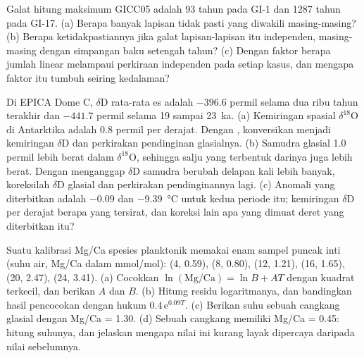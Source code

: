 \begin{exercise}[$\star\star$]\label{exo:b2:climate-proxies:9}
Galat hitung maksimum GICC05 adalah 93 tahun pada GI-1 dan \num{1287} tahun pada GI-17. (a) Berapa banyak
lapisan tidak pasti yang diwakili masing-masing? (b) Berapa ketidakpastiannya jika galat lapisan-lapisan
itu independen, masing-masing dengan simpangan baku setengah tahun? (c) Dengan faktor berapa
jumlah linear melampaui perkiraan independen pada setiap kasus, dan mengapa faktor itu tumbuh seiring kedalaman?
\end{exercise}

\begin{exercise}[$\star\star\star$]\label{exo:b2:climate-proxies:10}
Di EPICA Dome C, $\delta$D rata-rata es adalah $-396.6$ permil selama dua ribu tahun terakhir
dan $-441.7$ permil selama 19 sampai \qty{23}{ka}. (a) Kemiringan spasial $\delta^{18}$O di Antarktika adalah
\num{0.8} permil per derajat. Dengan , konversikan menjadi kemiringan $\delta$D dan
perkirakan pendinginan glasialnya. (b) Samudra glasial \num{1.0} permil lebih berat dalam
$\delta^{18}$O, sehingga salju yang terbentuk darinya juga lebih berat. Dengan menganggap $\delta$D samudra
berubah delapan kali lebih banyak, koreksilah $\delta$D glasial dan perkirakan pendinginannya lagi.
(c) Anomali yang diterbitkan adalah $-0.09$ dan \qty{-9.39}{\celsius} untuk kedua periode itu; kemiringan
$\delta$D per derajat berapa yang tersirat, dan koreksi lain apa yang dimuat deret yang diterbitkan itu?
\end{exercise}

\begin{exercise}[$\star\star\star$]\label{exo:b2:climate-proxies:11}
Suatu kalibrasi Mg/Ca spesies planktonik memakai enam sampel puncak inti (suhu air,
Mg/Ca dalam \unit{mmol/mol}): (4, 0.59), (8, 0.80), (12, 1.21), (16, 1.65), (20, 2.47), (24, 3.41).
(a) Cocokkan $\ln(\text{Mg/Ca}) = \ln B + AT$ dengan kuadrat terkecil, dan berikan $A$ dan $B$. (b) Hitung
residu logaritmanya, dan bandingkan hasil pencocokan dengan hukum $0.4\,\mathrm{e}^{0.09T}$. (c) Berikan
suhu sebuah cangkang glasial dengan Mg/Ca = 1.30. (d) Sebuah cangkang memiliki Mg/Ca = 0.45: hitung
suhunya, dan jelaskan mengapa nilai ini kurang layak dipercaya daripada nilai sebelumnya.
\end{exercise}

